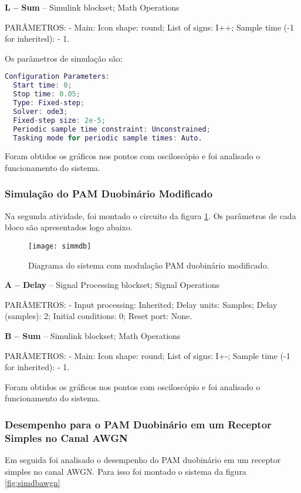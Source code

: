 \textbf{L – Sum} – Simulink blockset; Math Operations

PARÂMETROS: - Main: Icon shape: round; List of signs: I++; Sample time (-1 for inherited): - 1.

Os parâmetros de simulação são:

\begin{lstlisting}[language=matlab]
  Configuration Parameters: 
  Start time: 0; 
  Stop time: 0.05; 
  Type: Fixed-step; 
  Solver: ode3;  
  Fixed-step size: 2e-5; 
  Periodic sample time constraint: Unconstrained; 
  Tasking mode for periodic sample times: Auto.
\end{lstlisting}

Foram obtidos os gráficos nos pontos com osciloscópio e foi analisado o funcionamento do sistema.

\subsubsection{Simulação do PAM Duobinário Modificado}

Na segunda atividade, foi montado o circuito da figura \ref{fig:simmdb}. Os parâmetros de cada bloco são apresentados logo abaixo.

\begin{figure}[H]
  \centering
  \caption{Diagrama do sistema com modulação PAM duobinário modificado.}
  \texttt{[image: simmdb]}
  \label{fig:simmdb}
\end{figure}

\textbf{A – Delay} – Signal Processing blockset; Signal Operations

PARÂMETROS: - Input processing: Inherited; Delay units: Samples; Delay (samples): 2; Initial conditions: 0; Reset port: None.

\textbf{B – Sum} – Simulink blockset; Math Operations 

PARÂMETROS: - Main: Icon shape: round; List of signs: I+-; Sample time (-1 for inherited): - 1.

Foram obtidos os gráficos nos pontos com osciloscópio e foi analisado o funcionamento do sistema.


\subsubsection{Desempenho para o PAM Duobinário em um Receptor Simples no Canal AWGN}

Em seguida foi analisado o desempenho do PAM duobinário em um receptor simples no canal AWGN. Para isso foi montado o sistema da figura \ref{fig:simdbawgn}


